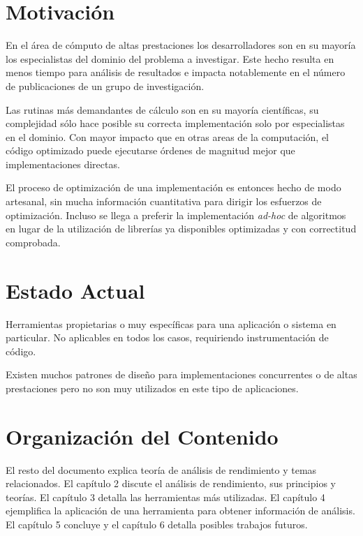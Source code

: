 \documentclass[a4paper]{report}
\begin{document}
\section{Motivaci\'on}

En el \'area de c\'omputo de altas prestaciones los desarrolladores son en su mayor\'ia los
especialistas del dominio del problema a investigar. Este hecho resulta en menos tiempo para
an\'alisis de resultados e impacta notablemente en el n\'umero de publicaciones de un grupo de
 investigaci\'on.

\bigskip

Las rutinas m\'as demandantes de c\'alculo son en su mayor\'ia cient\'ificas, su complejidad s\'olo
hace posible su correcta implementaci\'on solo por especialistas en el dominio.
Con mayor impacto que en otras areas de la computaci\'on, el c\'odigo optimizado puede ejecutarse
\'ordenes de magnitud mejor que implementaciones directas.

\bigskip

El proceso de optimizaci\'on de una implementaci\'on es entonces hecho de modo artesanal,
sin mucha informaci\'on cuantitativa para dirigir los esfuerzos de optimizaci\'on.
Incluso se llega a preferir la implementaci\'on {\em ad-hoc} de algoritmos en lugar de la
utilizaci\'on de librer\'ias ya disponibles optimizadas y con correctitud comprobada.

\cite{parallel-programming}

\section{Estado Actual}

Herramientas propietarias o muy espec\'ificas para una aplicaci\'on o sistema en particular.
No aplicables en todos los casos, requiriendo instrumentaci\'on de c\'odigo.

\bigskip

Existen muchos patrones de dise\~no para implementaciones concurrentes o de altas prestaciones
pero no son muy utilizados en este tipo de aplicaciones.

\section{Organizaci\'on del Contenido}

El resto del documento explica teor\'ia de an\'alisis de rendimiento y temas
relacionados. El cap\'itulo 2 discute el an\'alisis de rendimiento, sus principios y teor\'ias.
El cap\'itulo 3 detalla las herramientas m\'as utilizadas. El cap\'itulo 4 ejemplifica la
aplicaci\'on de una herramienta para obtener informaci\'on de an\'alisis.
El cap\'itulo 5 concluye y el cap\'itulo 6 detalla posibles trabajos futuros.
\end{document}
